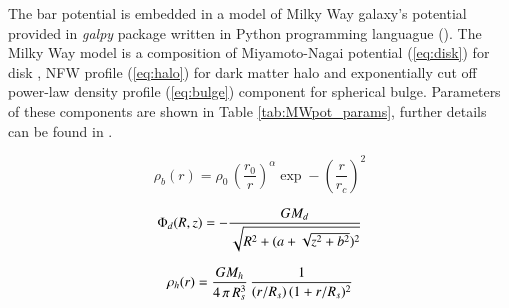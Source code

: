 \documentclass[a4paper,fleqn,usenatbib]{mnras}
\begin{document}
The bar potential is embedded in a model of Milky Way galaxy's potential provided in \textit{galpy} package written in Python programming languague (\cite{Bovy:2015}). The Milky Way model is a composition of Miyamoto-Nagai potential (\ref{eq:disk}) for disk \cite{MiyamotoNagai:1975}, NFW profile (\ref{eq:halo}) for dark matter halo \cite{NFW:1996} and exponentially cut off power-law density profile (\ref{eq:bulge}) component for spherical bulge. Parameters of these components are shown in Table \ref{tab:MWpot_params}, further details can be found in \cite{Bovy:2015}.



\begin{equation}\label{eq:bulge}
	\rho_b(r)=\rho_0 \, \left(  \frac{r_0}{r} \right) ^{\alpha} \exp -\left( \frac{r}{r_c} \right)^2
\end{equation}

\begin{equation}\label{eq:disk}
	\Phi_d(R,z) = -\frac{GM_d}{\sqrt{R^2+(a+\sqrt{z^2+b^2})^2}}\\
\end{equation}

\begin{equation}\label{eq:halo}
	\rho_h(r) = \frac{GM_h}{4\,\pi\,R_s^3}\,\frac{1}{(r/R_s)\,(1+r/R_s)^{2}}\\
\end{equation}
\end{document}
